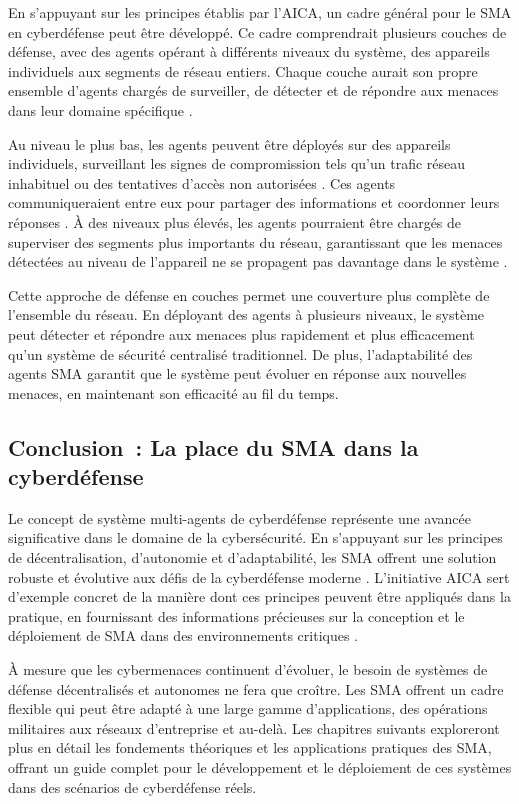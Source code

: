 En s'appuyant sur les principes établis par l'AICA, un cadre général pour le SMA en cyberdéfense peut être développé. Ce cadre comprendrait plusieurs couches de défense, avec des agents opérant à différents niveaux du système, des appareils individuels aux segments de réseau entiers. Chaque couche aurait son propre ensemble d'agents chargés de surveiller, de détecter et de répondre aux menaces dans leur domaine spécifique \cite{bou-harb2017cyber}.

Au niveau le plus bas, les agents peuvent être déployés sur des appareils individuels, surveillant les signes de compromission tels qu'un trafic réseau inhabituel ou des tentatives d'accès non autorisées \cite{kolias2011swarm}. Ces agents communiqueraient entre eux pour partager des informations et coordonner leurs réponses \cite{shamshirband2018computational}. À des niveaux plus élevés, les agents pourraient être chargés de superviser des segments plus importants du réseau, garantissant que les menaces détectées au niveau de l'appareil ne se propagent pas davantage dans le système \cite{hu2018mimic}.

Cette approche de défense en couches permet une couverture plus complète de l'ensemble du réseau. En déployant des agents à plusieurs niveaux, le système peut détecter et répondre aux menaces plus rapidement et plus efficacement qu'un système de sécurité centralisé traditionnel. De plus, l'adaptabilité des agents SMA garantit que le système peut évoluer en réponse aux nouvelles menaces, en maintenant son efficacité au fil du temps.

\subsection{Conclusion : La place du SMA dans la cyberdéfense}

Le concept de système multi-agents de cyberdéfense représente une avancée significative dans le domaine de la cybersécurité. En s'appuyant sur les principes de décentralisation, d'autonomie et d'adaptabilité, les SMA offrent une solution robuste et évolutive aux défis de la cyberdéfense moderne \cite{kolias2011swarm}. L'initiative AICA sert d'exemple concret de la manière dont ces principes peuvent être appliqués dans la pratique, en fournissant des informations précieuses sur la conception et le déploiement de SMA dans des environnements critiques \cite{bou-harb2014cyber}.

À mesure que les cybermenaces continuent d'évoluer, le besoin de systèmes de défense décentralisés et autonomes ne fera que croître. Les SMA offrent un cadre flexible qui peut être adapté à une large gamme d'applications, des opérations militaires aux réseaux d'entreprise et au-delà. Les chapitres suivants exploreront plus en détail les fondements théoriques et les applications pratiques des SMA, offrant un guide complet pour le développement et le déploiement de ces systèmes dans des scénarios de cyberdéfense réels.

